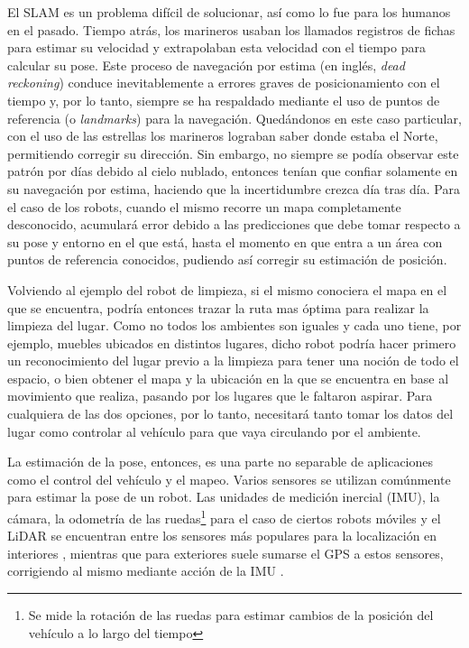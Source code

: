 El SLAM es un problema difícil de solucionar, así como lo fue para los humanos en el pasado. Tiempo atrás, los marineros usaban los llamados registros de fichas para estimar su velocidad y extrapolaban esta velocidad con el tiempo para calcular su pose. Este proceso de navegación por estima (en inglés, \textit{dead reckoning}) conduce inevitablemente a errores graves de posicionamiento con el tiempo y, por lo tanto, siempre se ha respaldado mediante el uso de puntos de referencia (o \textit{landmarks}) para la navegación. Quedándonos en este caso particular, con el uso de las estrellas los marineros lograban saber donde estaba el Norte, permitiendo corregir su dirección. Sin embargo, no siempre se podía observar este patrón por días debido al cielo nublado, entonces tenían que confiar solamente en su navegación por estima, haciendo que la incertidumbre crezca día tras día. Para el caso de los robots, cuando el mismo recorre un mapa completamente desconocido, acumulará error debido a las predicciones que debe tomar respecto a su pose y entorno en el que está, hasta el momento en que entra a un área con puntos de referencia conocidos, pudiendo así corregir su estimación de posición.

Volviendo al ejemplo del robot de limpieza, si el mismo conociera el mapa en el que se encuentra, podría entonces trazar la ruta mas óptima para realizar la limpieza del lugar. Como no todos los ambientes son iguales y cada uno tiene, por ejemplo, muebles ubicados en distintos lugares, dicho robot podría hacer primero un reconocimiento del lugar previo a la limpieza para tener una noción de todo el espacio, o bien obtener el mapa y la ubicación en la que se encuentra en base al movimiento que realiza, pasando por los lugares que le faltaron aspirar. Para cualquiera de las dos opciones, por lo tanto, necesitará tanto tomar los datos del lugar como controlar al vehículo para que vaya circulando por el ambiente.

La
\fi
estimación de la pose, entonces, es una parte no separable de aplicaciones como el control del vehículo y el mapeo. Varios sensores se utilizan comúnmente para estimar la pose de un robot. Las unidades de medición inercial (IMU), la cámara, la odometría de las ruedas\footnote{Se mide la rotación de las ruedas para estimar cambios de la posición del vehículo a lo largo del tiempo} para el caso de ciertos robots móviles y el LiDAR se encuentran entre los sensores más populares para la localización en interiores \cite{delrosario2016}, mientras que para exteriores suele sumarse el GPS a estos sensores, corrigiendo al mismo mediante acción de la IMU \cite{caron2006}.


